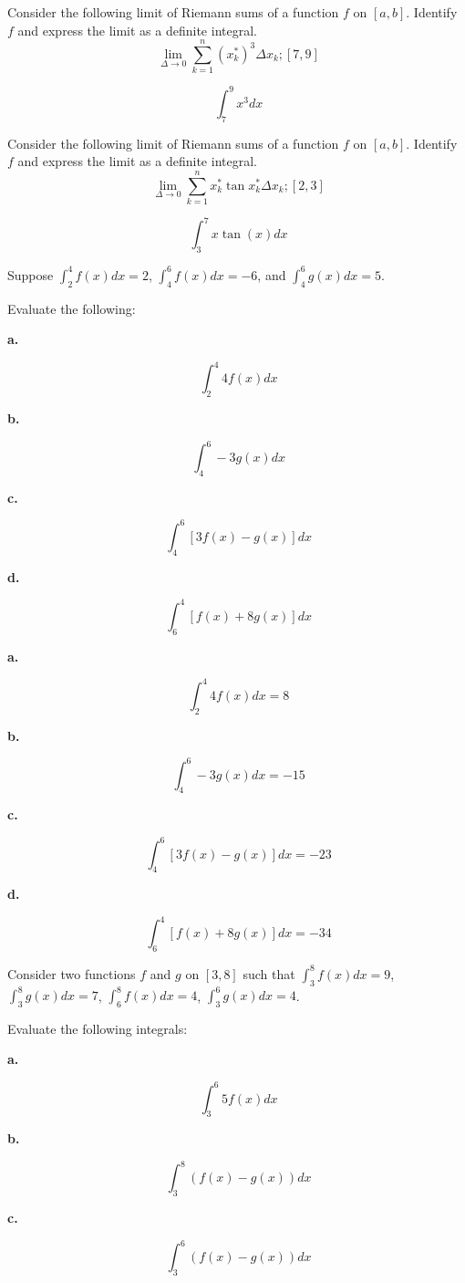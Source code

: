 Consider the following limit of Riemann sums of a function $f$
on $[a, b]$. Identify $f$ and express the limit as a definite
integral.
$$\
\lim_{\Delta \to 0} \sum_{k = 1}^{n} \left(x_k^*\right)^3\Delta x_k; [7,9]
$$

$$\
\int_7^9 x^3 dx
$$

Consider the following limit of Riemann sums of a function $f$
on $[a, b]$. Identify $f$ and express the limit as a definite
integral.
$$\
\lim_{\Delta \to 0} \sum_{k = 1}^{n} 
x^*_k \tan x^*_k \Delta x_k; [2,3]
$$

$$\
\int_3^7 x \tan(x) dx
$$

 \bigskip
{} \bigskip
{} \bigskip
{}
Suppose
$\int_2^4 f(x)dx = 2$,
$\int_4^6 f(x)dx = -6$, and
$\int_4^6 g(x)dx = 5$.

Evaluate the following:

{\par \bf a.}
$$\
\int_2^4 4f(x) dx
$$

{\par \bf b.}
$$\
\int_4^6 -3g(x) dx
$$

{\par \bf c.}
$$\
\int_4^6 [3f(x) - g(x)] dx
$$

{\par \bf d.}
$$\
\int_6^4 [f(x) + 8g(x)] dx
$$

{\par \bf a.}
$$\
\int_2^4 4f(x) dx = 8
$$

{\par \bf b.}
$$\
\int_4^6 -3g(x) dx = -15
$$

{\par \bf c.}
$$\
\int_4^6 [3f(x) - g(x)] dx = -23
$$

{\par \bf d.}
$$\
\int_6^4 [f(x) + 8g(x)] dx = -34
$$

Consider two functions $f$ and $g$ on $[3,8]$ such that
$\int_3^8 f(x) dx = 9$,
$\int_3^8 g(x) dx = 7$,
$\int_6^8 f(x) dx = 4$,
$\int_3^6 g(x) dx = 4$.

Evaluate the following integrals:

{\par \bf a.}
$$\
\int_3^6 5 f(x) dx
$$

{\par \bf b.}
$$\
\int_3^8 (f(x) - g(x)) dx
$$

{\par \bf c.}
$$\
\int_3^6 (f(x) - g(x)) dx
$$


